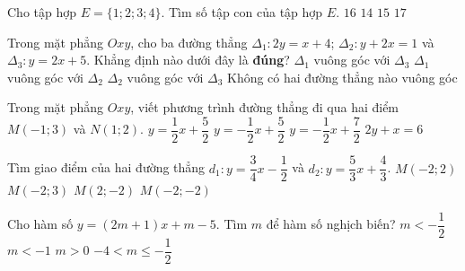\begin{ex}%
	Cho tập hợp $E=\{1;2;3;4\}$. Tìm số tập con của tập hợp $E$.
	\choice
	{\True $16$}
	{$14$}
	{$15$}
	{$17$}
\end{ex}
\begin{ex}%
	Trong mặt phẳng $Oxy$, cho ba đường thẳng $\Delta_1:2y=x+4$; $\Delta_2:y+2x=1$ và $\Delta_3:y=2x+5$. Khẳng định nào dưới đây là \textbf{đúng}?
	\choice
	{$\Delta_1$ vuông góc với $\Delta_3$}
	{\True $\Delta_1$ vuông góc với $\Delta_2$}
	{$\Delta_2$ vuông góc với $\Delta_3$}
	{Không có hai đường thẳng nào vuông góc}
\end{ex}
\begin{ex}%
	Trong mặt phẳng $Oxy$, viết phương trình đường thẳng đi qua hai điểm $M(-1;3)$ và $N(1;2)$.
	\choice
	{$y=\dfrac{1}{2}x+\dfrac{5}{2}$}
	{\True $y=-\dfrac{1}{2}x+\dfrac{5}{2}$}
	{$y=-\dfrac{1}{2}x+\dfrac{7}{2}$}
	{$2y+x=6$}
\end{ex}
\begin{ex}%
	Tìm giao điểm của hai đường thẳng $d_1:y=\dfrac{3}{4}x-\dfrac{1}{2}$ và $d_2:y=\dfrac{5}{3}x+\dfrac{4}{3}$.
	\choice
	{$M(-2;2)$}
	{$M(-2;3)$}
	{$M(2;-2)$}
	{\True $M(-2;-2)$}
\end{ex}
\begin{ex}%
	Cho hàm số $y=(2m+1)x+m-5$. Tìm $m$ để hàm số nghịch biến?
	\choice
	{\True $m<-\dfrac{1}{2}$}
	{$m<-1$}
	{$m>0$}
	{$-4<m\le -\dfrac{1}{2}$}
\end{ex}
